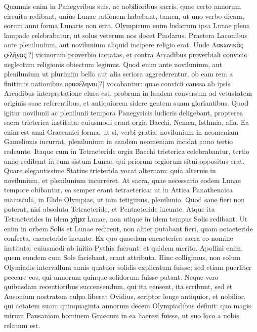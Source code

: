 Quamuis enim in
Panegyribus suis, ac nobilioribus sacris, quae certo annorum circuitu
redibant, unius Lunae rationem habebant, tamen, ut uno verbo
dicam, eorum anni forma Lunaris non erat.
Olympicum enim ludicrum
ipsa Lunae plena lampade celebrabatur, ut solus veterum nos
docet Pindarus. 
Praetera Laconibus ante plenilunium, aut novilunium
aliquid incipere religio erat.
Unde \textgreek{Λακωνικὰς ςελἠνας}[?] vicinorum
proverbio iactatas, et contra Arcadibus proverbiali convicio
neglectum religionis obiectum legimus. 
Quod enim ante novilunium,
aut plenilunium ut plurimim bella aut alia seriora aggrederentur,
ob eam rem a finitimis nationibus \textgreek{προσέληνοι[?]} vocabantur:
quae convicii caussa ab ipsis Arcadibus interpretatione elusa est,
probrum in laudem conversum ad vetustatem originis suae referentibus,
et antiquiorem sidere gentem suam gloriantibus. 
Quod igitur
novilunii ac plenilunii tempora Panegyricis ludicris deligebant,
propterea sacra trieterica instituta: cuiusmodi erant orgia Bacchi,
Nemea, Isthmia, alia.
Ea enim est anni Graecanici forma, ut si, verbi
gratia, novilunium in neomeniam Gamelionis incurrat, plenilunium
in eandem neomeniam incidat anno tertio redeunte.
Itaque
cum in Tetraeteride orgia Bacchi trieterica celebrabantur, tertio
anno redibant in eum sistum Lunae, qui priorum orgiorum situi oppositus
erat.
Quare elegantissime Statius trieterida vocat alternam:
quia alternis in novilunium, et plenilunium incurreret.
At sacra,
quae necessario eodem Lunae tempore obibantur, ea semper erant
tetraeterica: ut in Attica Panathenaica maiuscula, in Elide Olympias,
ut iam tetigimus, plenilunio.
Quod sane fieri non poterat, nisi absoluta
Tetraeteride, et Pentaeteride ineunte.
Atque ita Tetraeterides
in idem \textgreek{χῆμα} Lunae, non utique in idem tempus Solis redibant.
Ut
enim in orbem Solis et Lunae redirent, non aliter putabant fieri,
quam octaeteride confecta, eneaeteride ineunte.
Ex quo quaedam
eneaeterica sacra eo nomine instituta: cuiusmodi ab initio Pythia
fuerunt: et quidem merito.
Apollini enim, quem eundem cum Sole
faciebant, erant attributa.
Hinc colligimus, non solum Olymiadis
intervallum annis quatuor solidis explicatum fuisse; sed etiam puerliter
peccare eos, qui annorum quinque solidorum fuisse putant.
Neque vero quibusdam recentioribus succensendum, qui ita censent,
ita scribunt, sed et Ausonium nostratem culpa liberat Ovidius, scriptor
longe antiquior, et nobilior, qui aetatem suam quinquaginta annorum
decem Olympiadibus definit: quo magis mirum Pausaniam
hominem Graecum in ea haeresi fuisse, ut suo loco a nobis relatum est.

